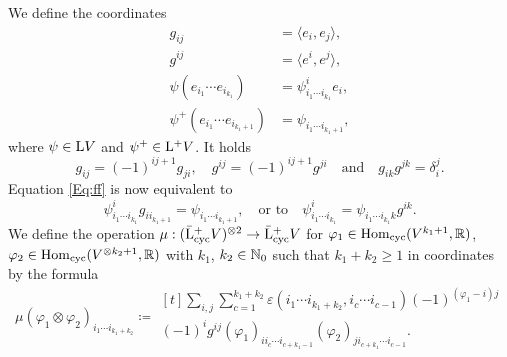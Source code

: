 \documentclass[\MainFolder/Text.tex]{subfiles}
\begin{document}
We define the coordinates
\begin{align*}
g_{ij} &= \langle e_i,e_j\rangle, \\
g^{ij} &= \langle e^i, e^j\rangle, \\
\psi(e_{i_1}\dotsb e_{i_{k_1}}) &= \psi_{i_1 \dotsb i_{k_1}}^i e_i, \\
\psi^+(e_{i_1}\dotsb e_{i_{k_1+1}}) & = \psi_{i_1 \dotsb i_{k_1 + 1}},
\end{align*}
where $\psi\in\mathrm{L} V$ and $\psi^+\in\mathrm{L}^+ V$. It holds
\[ g_{ij} = (-1)^{i j + 1} g_{ji}, \quad g^{ij} = (-1)^{ij + 1} g^{ji} \quad \text{and}\quad g_{ik}g^{jk} = \delta_i^j. \] 
Equation \eqref{Eq:ff} is now equivalent to 
\begin{equation}\label{Eq:TransfForm}
\psi^i_{i_1 \dotsb i_{k_1}} g_{i i_{k_1+1}}  = \psi_{i_1\dotsb i_{k_1 + 1}},\quad\text{or to}\quad \psi^i_{i_1\dotsb i_{k_1}} = \psi_{i_1 \dotsb i_{k_1} k} g^{ik}.
\end{equation}
We define the operation $\mu: (\bar{\mathrm{L}}^+_{\mathrm{cyc}} V)^{\otimes 2} \rightarrow \bar{\mathrm{L}}^+_{\mathrm{cyc}} V$ for $\varphi_1\in \mathrm{Hom}_{\mathrm{cyc}}(V^{k_1 + 1},\mathbb{R})$, $\varphi_2\in \mathrm{Hom}_{\mathrm{cyc}}(V^{\otimes k_2 + 1},\mathbb{R})$ with $k_1$, $k_2\in \mathbb{N}_0$ such that $k_1+k_2 \ge 1$ in coordinates by the formula 
\begin{equation}\label{Eq:CoordFormula}
\mu(\varphi_1 \otimes \varphi_2)_{i_1 \dotsb i_{k_1 + k_2}} \coloneqq\begin{multlined}[t] 
\sum_{i,j}\sum_{c=1}^{k_1 + k_2} \varepsilon(i_1 \dotsb i_{k_1 + k_2},i_c \dotsb i_{c-1})(-1)^{(\varphi_1 - i)j} \\ (-1)^i g^{ij} (\varphi_1)_{i i_c \dotsb i_{c+k_1-1}} (\varphi_2)_{j i_{c+k_1} \dotsb i_{c-1}}.
\end{multlined}
\end{equation}
\end{document}
